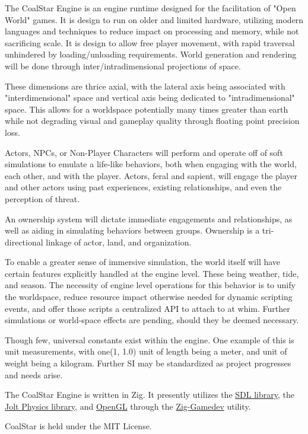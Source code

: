
The CoalStar Engine is an engine runtime designed for the facilitation of "Open World" games. It is design to run on older and limited hardware, utilizing modern languages and techniques to reduce impact on processing and memory, while not sacrificing scale. It is design to allow free player movement, with rapid traversal unhindered by loading/unloading requirements. World generation and rendering will be done through inter/intradimensional projections of space.

These dimensions are thrice axial, with the lateral axis being associated with "interdimensional" space and vertical axis being dedicated to "intradimensional" space. This allows for a worldspace potentially many times greater than earth while not degrading visual and gameplay quality through floating point precision loss.

Actors, NPCs, or Non-Player Characters will perform and operate off of soft simulations to emulate a life-like behaviors, both when engaging with the world, each other, and with the player. Actors, feral and sapient, will engage the player and other actors using past experiences, existing relationships, and even the perception of threat.

An ownership system will dictate immediate engagements and relationships, as well as aiding in simulating behaviors between groups. Ownership is a tri-directional linkage of actor, land, and organization.

To enable a greater sense of immersive simulation, the world itself will have certain features explicitly handled at the engine level. These being weather, tide, and season. The necessity of engine level operations for this behavior is to unify the worldspace, reduce resource impact otherwise needed for dynamic scripting events, and offer those scripts a centralized API to attach to at whim. Further simulations or world-space effects are pending, should they be deemed necessary.

Though few, universal constants exist within the engine. One example of this is unit measurements, with one(1, 1.0) unit of length being a meter, and unit of weight being a kilogram. Further SI may be standardized as project progresses and needs arise.

The CoalStar Engine is written in Zig. It presently utilizes the \href{https://www.libsdl.org/}{SDL library}, the \href{https://github.com/jrouwe/JoltPhysics}{Jolt Physics library}, and \href{https://www.opengl.org/}{OpenGL} through the 
\href{https://github.com/zig-gamedev/zig-gamedev}{Zig-Gamedev} utility.

CoalStar is held under the MIT License.